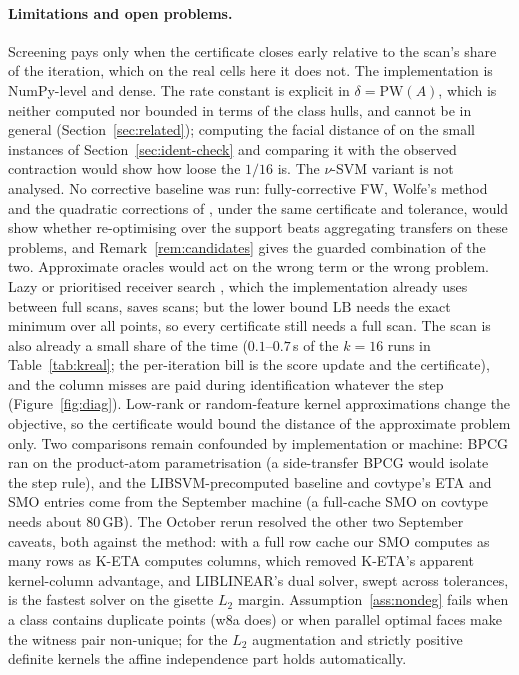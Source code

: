 \documentclass[pdflatex,sn-apa]{sn-jnl}%
\theoremstyle{thmstyleone}
\theoremstyle{thmstyletwo}
\newcommand{\PW}{\mathrm{PW}}
\newcommand{\LB}{\mathrm{LB}}
\begin{document}
\paragraph{Limitations and open problems.}\label{sec:limits}
Screening pays only when the certificate closes early relative to the
scan's share of the iteration, which on the real cells here it does
not. The implementation is NumPy-level and dense. The rate constant is
explicit in $\delta=\PW(A)$, which is neither computed nor bounded in
terms of the class hulls, and cannot be in general
(Section~\ref{sec:related}); computing the facial distance of
\citet{pena2019} on the small instances of Section~\ref{sec:ident-check}
and comparing it with the observed contraction would show how loose
the $1/16$ is. The $\nu$-SVM variant is not analysed. No corrective
baseline was run: fully-corrective FW, Wolfe's method and the quadratic
corrections of \citet{halbey2025}, under the same certificate and
tolerance, would show whether re-optimising over the support beats
aggregating transfers on these problems, and Remark~\ref{rem:candidates}
gives the guarded combination of the two. Approximate oracles would act
on the wrong term or the wrong problem. Lazy or prioritised receiver
search \citep{braun2019}, which the implementation already uses
between full scans, saves scans; but the lower bound $\LB$ needs the
exact minimum over all points, so every certificate still needs a full
scan. The scan is also already a small share of the time ($0.1$--$0.7$\,s
of the $k{=}16$ runs in Table~\ref{tab:kreal}; the per-iteration bill is the
score update and the certificate), and the column misses are paid during
identification whatever the step (Figure~\ref{fig:diag}). Low-rank or random-feature
kernel approximations change the objective, so the certificate would
bound the distance of the approximate problem only. Two comparisons remain confounded
by implementation or machine: BPCG ran on the product-atom
parametrisation (a side-transfer BPCG would isolate the step rule), and
the LIBSVM-precomputed baseline and covtype's ETA and SMO entries come
from the September machine (a full-cache SMO on covtype needs about
$80$\,GB). The October rerun resolved the other two September caveats,
both against the method: with a full row cache our SMO computes as many
rows as K-ETA computes columns, which removed K-ETA's apparent
kernel-column advantage, and LIBLINEAR's dual solver, swept across
tolerances, is the fastest solver on the gisette $L_2$ margin. Assumption~\ref{ass:nondeg} fails
when a class contains duplicate points (w8a does) or when parallel
optimal faces make the witness pair non-unique; for the $L_2$
augmentation and strictly positive definite kernels the affine
independence part holds automatically.
\end{document}
